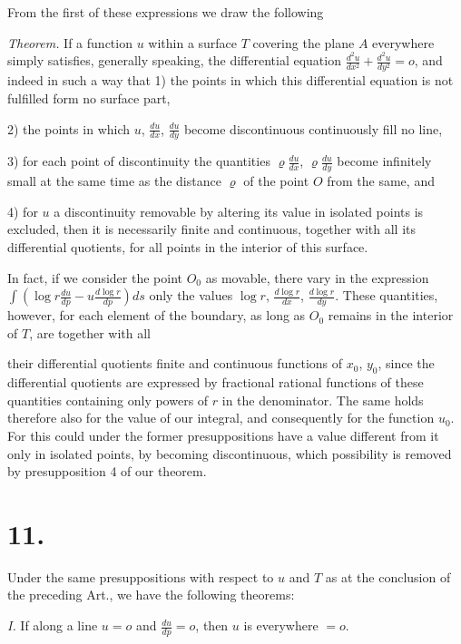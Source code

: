 \documentclass{article}
\begin{document}
From the first of these expressions we draw the following

\emph{Theorem.} If a function $u$ within a surface $T$ covering the plane $A$ everywhere simply satisfies, generally speaking, the differential equation $\frac{d^2u}{dx^2} + \frac{d^2u}{dy^2} = o$, and indeed in such a way that
1) the points in which this differential equation is not fulfilled form no surface part,


2) the points in which $u$, $\frac{du}{dx}$, $\frac{du}{dy}$ become discontinuous continuously fill no line,


3) for each point of discontinuity the quantities $\varrho\frac{du}{dx}$, $\varrho\frac{du}{dy}$ become infinitely small at the same time as the distance $\varrho$ of the point $O$ from the same, and


4) for $u$ a discontinuity removable by altering its value in isolated points is excluded,
then it is necessarily finite and continuous, together with all its differential quotients, for all points in the interior of this surface.

In fact, if we consider the point $O_0$ as movable, there vary in the expression $\displaystyle\int \left(\log r\frac{du}{dp} - u\frac{d\log r}{dp}\right) ds$ only the values $\log r$, $\frac{d\log r}{dx}$, $\frac{d\log r}{dy}$. These quantities, however, for each element of the boundary, as long as $O_0$ remains in the interior of $T$, are together with all

their differential quotients finite and continuous functions of $x_0$, $y_0$, since the differential quotients are expressed by fractional rational functions of these quantities containing only powers of $r$ in the denominator. The same holds therefore also for the value of our integral, and consequently for the function $u_0$. For this could under the former presuppositions have a value different from it only in isolated points, by becoming discontinuous, which possibility is removed by presupposition 4 of our theorem.

\section*{11.}

Under the same presuppositions with respect to $u$ and $T$ as at the conclusion of the preceding Art., we have the following theorems:

\emph{I.} If along a line $u = o$ and $\frac{du}{dp} = o$, then $u$ is everywhere $= o$.
\end{document}
